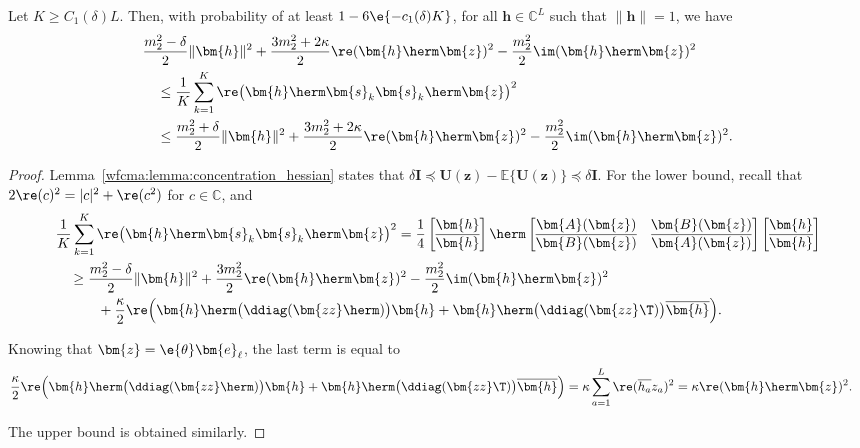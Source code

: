 \begin{cor} \label{wfcma:cor:re2} %
	Let $K\geq C_1(\delta)L$. Then, with probability of at least $1-6\e{-c_1(\delta)K}$, for all $\bm{h}\in\mathbb{C}^L$ such that $\|\bm{h}\|=1$, we have
	\begin{align}
		&\frac{m_2^2-\delta}{2}\|\bm{h}\|^2+\frac{3m_2^2+2\kappa}{2}\re(\bm{h}\herm\bm{z})^2-\frac{m_2^2}{2}\im(\bm{h}\herm\bm{z})^2\nonumber\\
		&\quad\leq\frac{1}{K}\sum_{k=1}^K\re\big(\bm{h}\herm\bm{s}_k\bm{s}_k\herm\bm{z}\big)^2\nonumber\\
		&\quad\leq  \frac{m_2^2+\delta}{2}\|\bm{h}\|^2+\frac{3m_2^2+2\kappa}{2}\re(\bm{h}\herm\bm{z})^2-\frac{m_2^2}{2}\im(\bm{h}\herm\bm{z})^2. \nonumber%
	\end{align}
\end{cor}
\begin{proof}
	Lemma~\ref{wfcma:lemma:concentration_hessian} states that 	$\delta\bm{I}\preceq\bm{U}(\bm{z})-\mathbb{E}\{\bm{U}(\bm{z})\}\preceq\delta\bm{I}$.
	For the lower bound, recall that  $2\re(c)^2=|c|^2+\re(c^2)$ for $c\in\mathbb{C}$, and 
	\begin{align}
		&\frac{1}{K}\sum_{k=1}^K\re\big(\bm{h}\herm\bm{s}_k\bm{s}_k\herm\bm{z}\big)^2
		=\frac{1}{4}\begin{bmatrix}
			\bm{h}\\%
			\overline{\bm{h}}
		\end{bmatrix}\herm
		\begin{bmatrix}
			\bm{A}(\bm{z})&\bm{B}(\bm{z})\\%
			\overline{\bm{B}(\bm{z})}&\overline{\bm{A}(\bm{z})}
		\end{bmatrix}
		\begin{bmatrix}
			\bm{h}\\%
			\overline{\bm{h}}
		\end{bmatrix}\nonumber\\
		&\quad\geq\frac{m_2^2-\delta}{2}\|\bm{h}\|^2+\frac{3m_2^2}{2}\re(\bm{h}\herm\bm{z})^2-\frac{m_2^2}{2} \im(\bm{h}\herm\bm{z})^2
		\nonumber\\&\qquad\quad
		+\frac{\kappa}{2}\re\Big(\bm{h}\herm\big(\ddiag(\bm{zz}\herm)\big)\bm{h}+\bm{h}\herm\big(\ddiag(\bm{zz}\T)\big)\overline{\bm{h}}\Big). \nonumber%
	\end{align}
	
	Knowing that $\bm{z}=\e{\theta}\bm{e}_{\ell}$, the last term is equal to 
	\begin{align}
		&\frac{\kappa}{2}\re\Big(\bm{h}\herm\big(\ddiag(\bm{zz}\herm)\big)\bm{h}+\bm{h}\herm\big(\ddiag(\bm{zz}\T)\big)\overline{\bm{h}}\Big)
		=\kappa\sum_{a=1}^L\re(\overline{h_a}z_a)^2=\kappa\re(\bm{h}\herm\bm{z})^2.\nonumber%
	\end{align}
	
	The upper bound is obtained similarly.
\end{proof}


